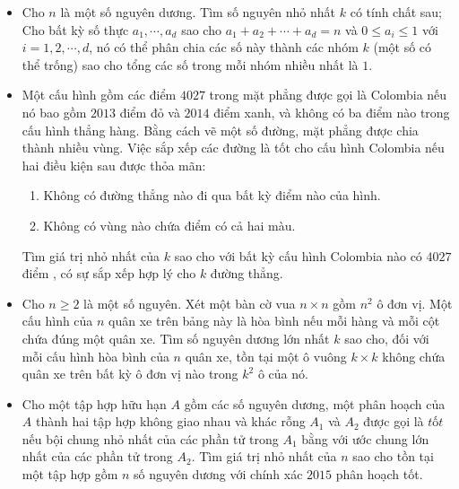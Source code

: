 \documentclass[11pt]{scrartcl}
\begin{document}
\begin{itemize}[label=, leftmargin=0em, itemsep=0.5em]
    \item\begin{btvn} Cho $n$ là một số nguyên dương. Tìm số nguyên nhỏ nhất $k$ có tính chất sau; Cho bất kỳ số thực $a_1 , \cdots , a_d $ sao cho $a_1 + a_2 + \cdots + a_d = n$ và $0 \le a_i \le 1$ với $i=1,2,\cdots ,d$, nó có thể phân chia các số này thành các nhóm $k$ (một số có thể trống) sao cho tổng các số trong mỗi nhóm nhiều nhất là $1$.
    \end{btvn}
    
    \item \begin{btvn}
        Một cấu hình gồm các điểm $4027$ trong mặt phẳng được gọi là Colombia nếu nó bao gồm $2013$ điểm đỏ và $2014$ điểm xanh, và không có ba điểm nào trong cấu hình thẳng hàng. Bằng cách vẽ một số đường, mặt phẳng được chia thành nhiều vùng. Việc sắp xếp các đường là tốt cho cấu hình Colombia nếu hai điều kiện sau được thỏa mãn:
        \begin{enumerate}
            \item Không có đường thẳng nào đi qua bất kỳ điểm nào của hình.
            \item Không có vùng nào chứa điểm có cả hai màu.
        \end{enumerate}
        Tìm giá trị nhỏ nhất của $k$ sao cho với bất kỳ cấu hình Colombia nào có $4027$ điểm , có sự sắp xếp hợp lý cho $k$ đường thẳng.
    \end{btvn}
    

    \item \begin{btvn}
        Cho $n \ge 2$ là một số nguyên. Xét một bàn cờ vua $n \times n$ gồm $n^2$ ô đơn vị. Một cấu hình của $n$ quân xe trên bảng này là hòa bình nếu mỗi hàng và mỗi cột chứa đúng một quân xe. Tìm số nguyên dương lớn nhất $k$ sao cho, đối với mỗi cấu hình hòa bình của $n$ quân xe, tồn tại một ô vuông $k \times k$ không chứa quân xe trên bất kỳ ô đơn vị nào trong $k^2$ ô của nó.
    \end{btvn}


    \item \begin{btvn}
        Cho một tập hợp hữu hạn $A$ gồm các số nguyên dương, một phân hoạch của $A$ thành hai tập hợp không giao nhau và khác rỗng $A_1$ và $A_2$ được gọi là $\textit{tốt}$ nếu bội chung nhỏ nhất của các phần tử trong $A_1$ bằng với ước chung lớn nhất của các phần tử trong $A_2$. Tìm giá trị nhỏ nhất của $n$ sao cho tồn tại một tập hợp gồm $n$ số nguyên dương với chính xác $2015$ phân hoạch tốt.
    \end{btvn}


\end{itemize}
\end{document}
